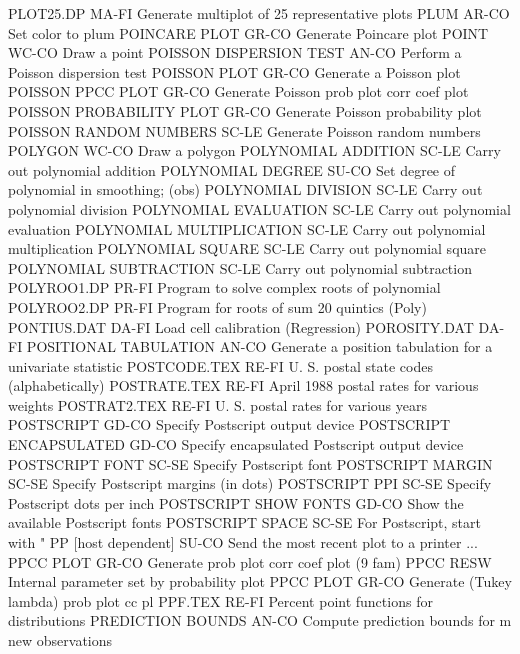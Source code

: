 PLOT25.DP                   MA-FI Generate multiplot of 25 representative plots
PLUM                        AR-CO Set color to plum
POINCARE PLOT               GR-CO Generate Poincare plot
POINT                       WC-CO Draw a point
POISSON DISPERSION TEST     AN-CO Perform a Poisson dispersion test
POISSON PLOT                GR-CO Generate a Poisson plot
POISSON PPCC PLOT           GR-CO Generate Poisson prob plot corr coef plot
POISSON PROBABILITY PLOT    GR-CO Generate Poisson probability plot
POISSON RANDOM NUMBERS      SC-LE Generate Poisson random numbers
POLYGON                     WC-CO Draw a polygon
POLYNOMIAL ADDITION         SC-LE Carry out polynomial addition
POLYNOMIAL DEGREE           SU-CO Set degree of polynomial in smoothing; (obs)
POLYNOMIAL DIVISION         SC-LE Carry out polynomial division
POLYNOMIAL EVALUATION       SC-LE Carry out polynomial evaluation
POLYNOMIAL MULTIPLICATION   SC-LE Carry out polynomial multiplication
POLYNOMIAL SQUARE           SC-LE Carry out polynomial square
POLYNOMIAL SUBTRACTION      SC-LE Carry out polynomial subtraction
POLYROO1.DP                 PR-FI Program to solve complex roots of polynomial
POLYROO2.DP                 PR-FI Program for roots of sum 20 quintics (Poly)
PONTIUS.DAT                 DA-FI Load cell calibration (Regression)
POROSITY.DAT                DA-FI 
POSITIONAL TABULATION       AN-CO Generate a position tabulation for a univariate statistic
POSTCODE.TEX                RE-FI U. S. postal state codes (alphabetically)
POSTRATE.TEX                RE-FI April 1988 postal rates for various weights
POSTRAT2.TEX                RE-FI U. S. postal rates for various years
POSTSCRIPT                  GD-CO Specify Postscript output device
POSTSCRIPT ENCAPSULATED     GD-CO Specify encapsulated Postscript output device
POSTSCRIPT FONT             SC-SE Specify Postscript font
POSTSCRIPT MARGIN           SC-SE Specify Postscript margins (in dots)
POSTSCRIPT PPI              SC-SE Specify Postscript dots per inch
POSTSCRIPT SHOW FONTS       GD-CO Show the available Postscript fonts
POSTSCRIPT SPACE            SC-SE For Postscript, start with "%
PP [host dependent]         SU-CO Send the most recent plot to a printer
... PPCC PLOT               GR-CO Generate prob plot corr coef plot (9 fam)
PPCC                        RESW  Internal parameter set by probability plot
PPCC PLOT                   GR-CO Generate (Tukey lambda) prob plot cc pl
PPF.TEX                     RE-FI Percent point functions for distributions
PREDICTION BOUNDS           AN-CO Compute prediction bounds for m new observations
